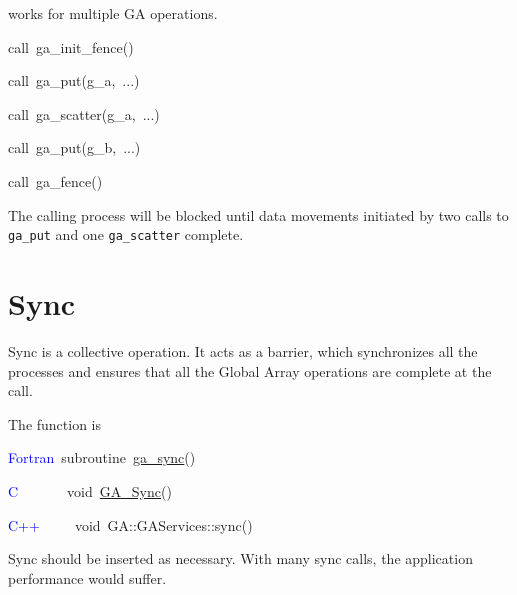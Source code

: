 \texttt{} works for multiple GA operations.
\begin{lyxcode}
call~ga\_init\_fence()~

call~ga\_put(g\_a,~...)~

call~ga\_scatter(g\_a,~...)~

call~ga\_put(g\_b,~...)~

call~ga\_fence()
\end{lyxcode}
The calling process will be blocked until data movements initiated
by two calls to \texttt{ga\_put} and one \texttt{ga\_scatter} complete. 


\section{Sync }

Sync is a collective operation. It acts as a barrier, which synchronizes
all the processes and ensures that all the Global Array operations
are complete at the call.

The function is
\begin{lyxcode}
\textcolor{blue}{Fortran}~subroutine~\href{http://www.emsl.pnl.gov/docs/global/ga_ops.html\#ga_sync}{ga\_{}sync}()~

\textcolor{blue}{C}~~~~~~~void~\href{http://www.emsl.pnl.gov/docs/global/c_nga_ops.html\#ga_sync}{GA\_{}Sync}()~

\textcolor{blue}{C++}~~~~~void~GA::GAServices::sync()
\end{lyxcode}
Sync should be inserted as necessary. With many sync calls, the application
performance would suffer. 
